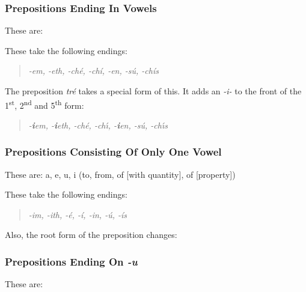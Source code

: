 \subsubsection{Prepositions Ending In Vowels}
These are:

These take the following endings:
\begin{quote}
\textit{-em, -eth, -ch\'{e}, -ch\'{i}, -en, -s\'{u}, -ch\'{i}s}
\end{quote}


The preposition \textit{tr\'{e}} takes a special form of this. It adds an \textit{-i-} to the front of the 1\textsuperscript{st}, 2\textsuperscript{nd} and 5\textsuperscript{th} form:
\begin{quote}
\textit{-\textbf{i}em, -\textbf{i}eth, -ch\'{e}, -ch\'{\i}, -\textbf{i}en, -s\'{u}, -ch\'{\i}s}
\end{quote}


\subsubsection{Prepositions Consisting Of Only One Vowel}
These are: a, e, u, i (to, from, of [with quantity], of [property])

These take the following endings:
\begin{quote}
\textit{-im, -ith, -\'{e}, -\'{i}, -in, -\'{u}, -\'{i}s}
\end{quote}

Also, the root form of the preposition changes:

\subsubsection{Prepositions Ending On \textit{-u}}
These are:


